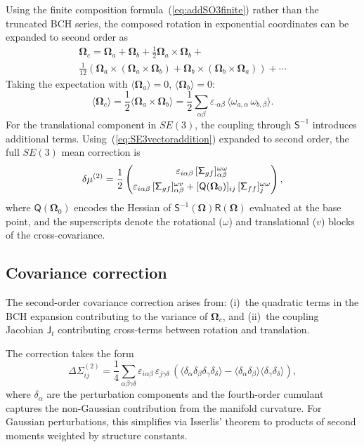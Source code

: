 \documentclass[journal]{IEEEtran}
\newcommand{\bfOmega}{\boldsymbol{\Omega}}
\newcommand{\sfSigma}[1]{\mathsf{\Sigma}_\mathnormal{#1}}
\newcommand{\beq}{\begin{equation}}
\newcommand{\eeq}{\end{equation}}
\begin{document}
Using the finite composition formula~(\ref{eq:addSO3finite}) rather than 
the truncated BCH series, the composed rotation in exponential coordinates 
can be expanded to second order as
\begin{multline}
    \bfOmega_c = \bfOmega_a + \bfOmega_b + \frac{1}{2}\bfOmega_a \times \bfOmega_b +\\
    \frac{1}{12}\left(\bfOmega_a \times (\bfOmega_a \times \bfOmega_b) 
    + \bfOmega_b \times (\bfOmega_b \times \bfOmega_a)\right) + \cdots
    \label{eq:BCHexpanded}
\end{multline}
Taking the expectation with $\langle \bfOmega_a \rangle = 0$, 
$\langle \bfOmega_b \rangle = 0$:
\beq
    \langle \bfOmega_c \rangle = \frac{1}{2}\langle \bfOmega_a \times \bfOmega_b \rangle
    = \frac{1}{2} \sum_{\alpha\beta} \varepsilon_{\cdot\alpha\beta}\, 
    \langle \omega_{a,\alpha}\, \omega_{b,\beta} \rangle.
    \label{eq:meanshift_rotation}
\eeq
For the translational component in $SE(3)$, the coupling through $\mathsf{S}^{-1}$ 
introduces additional terms. Using~(\ref{eq:SE3vectoraddition}) expanded to second order,
the full $SE(3)$ mean correction is
\beq
    \delta\mu^{(2)} = \frac{1}{2}
    \begin{pmatrix}
    \varepsilon_{i\alpha\beta}\, [\sfSigma{gf}]_{\alpha\beta}^{\omega\omega} \\[4pt]
    \varepsilon_{i\alpha\beta}\, [\sfSigma{gf}]_{\alpha\beta}^{\omega v}
    + [\mathsf{Q}(\bfOmega_0)]_{ij}\, [\sfSigma{ff}]_{j}^{\omega\omega}
    \end{pmatrix},
    \label{eq:fullmeancorrection}
\eeq
where $\mathsf{Q}(\bfOmega_0)$ encodes the Hessian of $\mathsf{S}^{-1}(\bfOmega)\mathsf{R}(\bfOmega)$
evaluated at the base point, and the superscripts denote the rotational ($\omega$) 
and translational ($v$) blocks of the cross-covariance.

\subsection{Covariance correction}

The second-order covariance correction arises from:
(i)~the quadratic terms in the BCH expansion contributing 
to the variance of $\bfOmega_c$, and
(ii)~the coupling Jacobian $\mathsf{J}_t$ contributing 
cross-terms between rotation and translation.

The correction takes the form
\beq
    \Delta\Sigma^{(2)}_{ij} = \frac{1}{4}\sum_{\alpha\beta\gamma\delta}
    \varepsilon_{i\alpha\beta}\,\varepsilon_{j\gamma\delta}\,
    \left(\langle \delta_\alpha \delta_\beta \delta_\gamma \delta_\delta \rangle
    - \langle \delta_\alpha \delta_\beta \rangle \langle \delta_\gamma \delta_\delta \rangle\right),
    \label{eq:covcorrection_explicit}
\eeq
where $\delta_\alpha$ are the perturbation components and the fourth-order
cumulant captures the non-Gaussian contribution from the manifold curvature.
For Gaussian perturbations, this simplifies via Isserlis' theorem to 
products of second moments weighted by structure constants.
\end{document}
